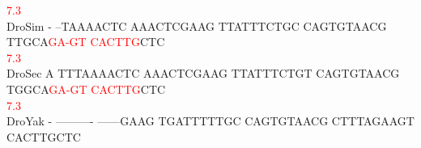 \documentclass[11pt,twoside,reqno,a4paper]{article}
\begin{document}
{\hspace*{7\charwidth}\hspace*{1\charwidth}\hspace*{1\charwidth}\hspace*{1\charwidth}\hspace*{1\charwidth}\hspace*{1\charwidth}\hspace*{46\charwidth}\textcolor{Red}{7.3}\hspace*{1\charwidth}\\
DroSim	-	--TAAAACTC	AAACTCGAAG	TTATTTCTGC	CAGTGTAACG	TTGCA\textcolor{Red}{G}\textcolor{Red}{A}\textcolor{Red}{-}\textcolor{Red}{G}\textcolor{Red}{T}	\textcolor{Red}{C}\textcolor{Red}{A}\textcolor{Red}{C}\textcolor{Red}{T}\textcolor{Red}{T}\textcolor{Red}{G}CTC\\
\hspace*{7\charwidth}\hspace*{1\charwidth}\hspace*{1\charwidth}\hspace*{1\charwidth}\hspace*{1\charwidth}\hspace*{1\charwidth}\hspace*{46\charwidth}\textcolor{Red}{7.3}\hspace*{1\charwidth}\\
DroSec	A	TTTAAAACTC	AAACTCGAAG	TTATTTCTGT	CAGTGTAACG	TGGCA\textcolor{Red}{G}\textcolor{Red}{A}\textcolor{Red}{-}\textcolor{Red}{G}\textcolor{Red}{T}	\textcolor{Red}{C}\textcolor{Red}{A}\textcolor{Red}{C}\textcolor{Red}{T}\textcolor{Red}{T}\textcolor{Red}{G}CTC\\
\hspace*{7\charwidth}\hspace*{1\charwidth}\hspace*{1\charwidth}\hspace*{1\charwidth}\hspace*{1\charwidth}\hspace*{1\charwidth}\hspace*{46\charwidth}\textcolor{Red}{7.3}\hspace*{1\charwidth}\\
DroYak	-	----------	------GAAG	TGATTTTTGC	CAGTGTAACG	CTTTAGAAGT	CACTTGCTC\\
\hspace*{7\charwidth}\hspace*{1\charwidth}\hspace*{1\charwidth}\hspace*{1\charwidth}\hspace*{1\charwidth}\hspace*{1\charwidth}\hspace*{1\charwidth}\\
}
\end{document}
